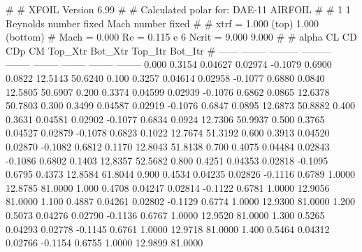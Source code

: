 #  
#       XFOIL         Version 6.99
#  
# Calculated polar for: DAE-11 AIRFOIL                                  
#  
# 1 1 Reynolds number fixed          Mach number fixed         
#  
# xtrf =   1.000 (top)        1.000 (bottom)  
# Mach =   0.000     Re =     0.115 e 6     Ncrit =   9.000  9.000
#  
#   alpha    CL        CD       CDp       CM     Top_Xtr  Bot_Xtr  Top_Itr  Bot_Itr
#  ------ -------- --------- --------- -------- -------- -------- -------- --------
   0.000   0.3154   0.04627   0.02974  -0.1079   0.6900   0.0822  12.5143  50.6240
   0.100   0.3257   0.04614   0.02958  -0.1077   0.6880   0.0840  12.5805  50.6907
   0.200   0.3374   0.04599   0.02939  -0.1076   0.6862   0.0865  12.6378  50.7803
   0.300   0.3499   0.04587   0.02919  -0.1076   0.6847   0.0895  12.6873  50.8882
   0.400   0.3631   0.04581   0.02902  -0.1077   0.6834   0.0924  12.7306  50.9937
   0.500   0.3765   0.04527   0.02879  -0.1078   0.6823   0.1022  12.7674  51.3192
   0.600   0.3913   0.04520   0.02870  -0.1082   0.6812   0.1170  12.8043  51.8138
   0.700   0.4075   0.04484   0.02843  -0.1086   0.6802   0.1403  12.8357  52.5682
   0.800   0.4251   0.04353   0.02818  -0.1095   0.6795   0.4373  12.8584  61.8044
   0.900   0.4534   0.04235   0.02826  -0.1116   0.6789   1.0000  12.8785  81.0000
   1.000   0.4708   0.04247   0.02814  -0.1122   0.6781   1.0000  12.9056  81.0000
   1.100   0.4887   0.04261   0.02802  -0.1129   0.6774   1.0000  12.9300  81.0000
   1.200   0.5073   0.04276   0.02790  -0.1136   0.6767   1.0000  12.9520  81.0000
   1.300   0.5265   0.04293   0.02778  -0.1145   0.6761   1.0000  12.9718  81.0000
   1.400   0.5464   0.04312   0.02766  -0.1154   0.6755   1.0000  12.9899  81.0000
